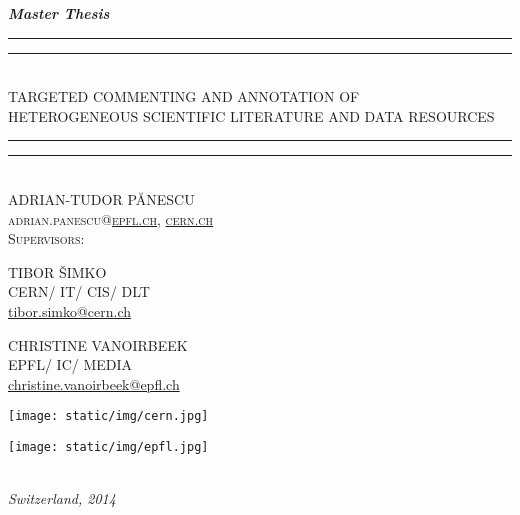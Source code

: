 
\begin{titlepage}
  \centering
  \vspace*{5\baselineskip}
  \textbf{\textit{Master Thesis}}
  \\\vspace*{\baselineskip}
  \rule{\textwidth}{1.6pt}\vspace*{-\baselineskip}\vspace*{2pt}
  \rule{\textwidth}{0.4pt}\\[\baselineskip]
  {TARGETED COMMENTING AND ANNOTATION OF\\[0.3\baselineskip] HETEROGENEOUS SCIENTIFIC LITERATURE AND DATA RESOURCES}
  \rule{\textwidth}{0.4pt}\vspace*{-\baselineskip}\vspace{3.2pt}
  \rule{\textwidth}{1.6pt}\\[\baselineskip]
  \scshape
  \vspace*{2\baselineskip}
  ADRIAN-TUDOR P\u{A}NESCU\\
  adrian.panescu@\href{mailto:adrian.panescu@epfl.ch}{epfl.ch},
                 \href{mailto:adrian.panescu@cern.ch}{cern.ch}
  \\\vspace*{4\baselineskip}
  Supervisors:
  \\\vspace*{1\baselineskip}
  \begin{minipage}{0.4\textwidth}
    \centering
    TIBOR \v{S}IMKO\\
    CERN/ IT/ CIS/ DLT\\
    \href{mailto:tibor.simko@cern.ch}{tibor.simko@cern.ch}
  \end{minipage}
  \begin{minipage}{0.4\textwidth}
    \centering
    CHRISTINE VANOIRBEEK\\
    EPFL/ IC/ MEDIA\\
    \href{mailto:christine.vanoirbeek@epfl.ch}{christine.vanoirbeek@epfl.ch}
  \end{minipage}
  \vfill
  \begin{minipage}{0.4\textwidth}
    \centering
    \texttt{[image: static/img/cern.jpg]}
  \end{minipage}
  \begin{minipage}{0.4\textwidth}
    \centering
    \texttt{[image: static/img/epfl.jpg]}
  \end{minipage}
  \\\vspace*{1\baselineskip}
  \textit{Switzerland, 2014}
\end{titlepage}
